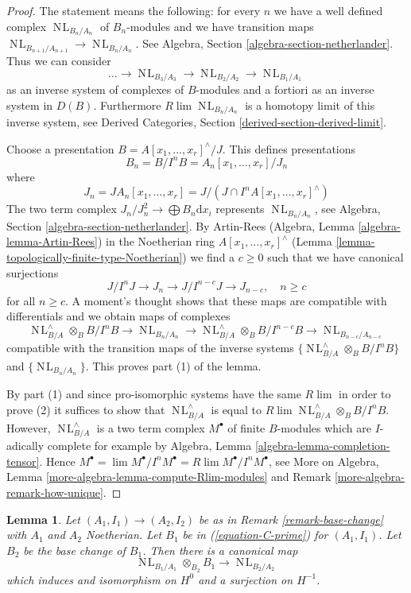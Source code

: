 \documentclass{stacks-project}
\theoremstyle{plain}
\newtheorem{lemma}[subsection]{Lemma}
\theoremstyle{definition}
\theoremstyle{remark}
\numberwithin{equation}{subsection}
\def\lim{\mathop{\mathrm{lim}}\nolimits}
\def\NL{\mathop{N\!L}\nolimits}
\begin{document}
\begin{proof}
The statement means the following: for every $n$ we have a well
defined complex $\NL_{B_n/A_n}$ of $B_n$-modules and we have
transition maps $\NL_{B_{n + 1}/A_{n + 1}} \to \NL_{B_n/A_n}$.
See Algebra, Section \ref{algebra-section-netherlander}.
Thus we can consider
$$
\ldots \to \NL_{B_3/A_3} \to \NL_{B_2/A_2} \to \NL_{B_1/A_1}
$$
as an inverse system of complexes of $B$-modules and a fortiori as
an inverse system in $D(B)$. Furthermore $R\lim \NL_{B_n/A_n}$
is a homotopy limit of this inverse system, see
Derived Categories, Section \ref{derived-section-derived-limit}.

\medskip\noindent
Choose a presentation $B = A[x_1, \ldots, x_r]^\wedge / J$. This
defines presentations
$$
B_n = B/I^nB = A_n[x_1, \ldots, x_r]/J_n
$$
where
$$
J_n = JA_n[x_1, \ldots, x_r] =
J/(J \cap I^nA[x_1, \ldots, x_r]^\wedge)
$$
The two term complex $J_n/J_n^2 \longrightarrow \bigoplus B_n \text{d}x_i$
represents $\NL_{B_n/A_n}$, see
Algebra, Section \ref{algebra-section-netherlander}.
By Artin-Rees (Algebra, Lemma \ref{algebra-lemma-Artin-Rees})
in the Noetherian ring $A[x_1, \ldots, x_r]^\wedge$
(Lemma \ref{lemma-topologically-finite-type-Noetherian})
we find a $c \geq 0$ such that we have canonical surjections
$$
J/I^nJ \to J_n \to J/I^{n - c}J \to J_{n - c},\quad n \geq c
$$
for all $n \geq c$. A moment's thought shows that these maps are
compatible with differentials and we obtain maps of complexes
$$
\NL_{B/A}^\wedge \otimes_B B/I^nB \to
\NL_{B_n/A_n} \to
\NL_{B/A}^\wedge \otimes_B B/I^{n - c}B \to
\NL_{B_{n - c}/A_{n - c}}
$$
compatible with the transition maps of the inverse systems
$\{\NL_{B/A}^\wedge \otimes_B B/I^nB\}$ and $\{\NL_{B_n/A_n}\}$.
This proves part (1) of the lemma.

\medskip\noindent
By part (1) and since pro-isomorphic
systems have the same $R\lim$ in order to prove (2)
it suffices to show that $\NL_{B/A}^\wedge$ is
equal to $R\lim \NL_{B/A}^\wedge \otimes_B B/I^nB$.
However, $\NL_{B/A}^\wedge$ is a two term complex $M^\bullet$
of finite $B$-modules which are $I$-adically complete for example by
Algebra, Lemma \ref{algebra-lemma-completion-tensor}. Hence
$M^\bullet = \lim M^\bullet/I^nM^\bullet = R\lim M^\bullet/I^n M^\bullet$, see
More on Algebra, Lemma \ref{more-algebra-lemma-compute-Rlim-modules} and
Remark \ref{more-algebra-remark-how-unique}.
\end{proof}

\begin{lemma}
\label{lemma-NL-base-change}
Let $(A_1, I_1) \to (A_2, I_2)$ be as in
Remark \ref{remark-base-change} with $A_1$ and $A_2$ Noetherian.
Let $B_1$ be in (\ref{equation-C-prime}) for $(A_1, I_1)$.
Let $B_2$ be the base change of $B_1$. Then there is a canonical map
$$
\NL_{B_1/A_1} \otimes_{B_2} B_1 \to \NL_{B_2/A_2}
$$
which induces and isomorphism on $H^0$ and a surjection on $H^{-1}$.
\end{lemma}
\end{document}

